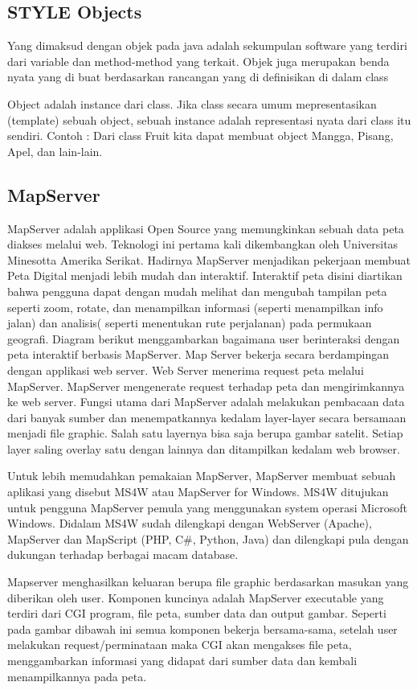 \subsection{STYLE Objects}
Yang dimaksud dengan objek pada java adalah sekumpulan software yang terdiri dari variable dan method-method yang terkait. 
Objek juga merupakan benda nyata yang di buat berdasarkan rancangan yang di definisikan di dalam class

Object adalah instance dari class. Jika class secara umum mepresentasikan (template) sebuah object, 
sebuah instance adalah representasi nyata dari class itu sendiri. Contoh : Dari class Fruit kita dapat membuat object Mangga, 
Pisang, Apel, dan lain-lain.

\subsection{MapServer}
MapServer adalah applikasi Open Source yang memungkinkan sebuah data peta diakses melalui web. Teknologi ini pertama kali dikembangkan oleh Universitas Minesotta Amerika Serikat. Hadirnya MapServer menjadikan pekerjaan membuat Peta Digital menjadi lebih mudah dan interaktif. Interaktif peta disini diartikan bahwa pengguna dapat dengan mudah melihat dan mengubah tampilan peta seperti zoom, rotate, dan menampilkan informasi (seperti menampilkan info jalan) dan analisis( seperti menentukan rute perjalanan) pada permukaan geografi. Diagram berikut menggambarkan bagaimana user berinteraksi dengan peta interaktif berbasis MapServer.
Map Server bekerja secara berdampingan dengan applikasi web server. Web Server menerima request peta melalui MapServer. MapServer mengenerate request terhadap peta dan mengirimkannya ke web server. Fungsi utama dari MapServer adalah melakukan pembacaan data dari banyak sumber dan menempatkannya kedalam layer-layer secara bersamaan menjadi file graphic. Salah satu layernya bisa saja berupa gambar satelit. Setiap layer saling overlay satu dengan lainnya dan ditampilkan kedalam web browser.

Untuk lebih memudahkan pemakaian MapServer, MapServer membuat sebuah aplikasi yang disebut MS4W atau MapServer for Windows. MS4W ditujukan untuk pengguna MapServer pemula yang menggunakan system operasi Microsoft Windows. Didalam MS4W sudah dilengkapi dengan WebServer (Apache), MapServer dan MapScript (PHP, C#, Python, Java) dan dilengkapi pula dengan dukungan terhadap berbagai macam database.

Mapserver menghasilkan keluaran berupa file graphic berdasarkan masukan yang diberikan oleh user. 
Komponen kuncinya adalah MapServer executable yang terdiri dari CGI program, file peta, sumber data dan output gambar. 
Seperti pada gambar dibawah ini semua komponen bekerja bersama-sama, 
setelah user melakukan request/perminataan maka CGI akan mengakses file peta, 
menggambarkan informasi yang didapat dari sumber data dan kembali menampilkannya pada peta.

